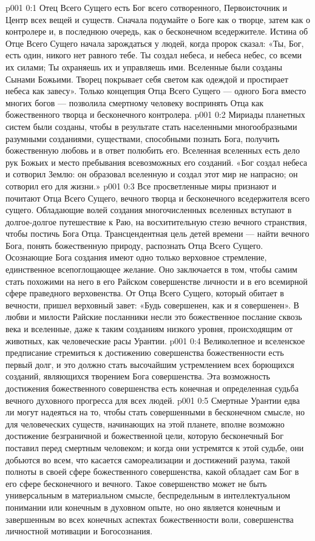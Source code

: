 \author{Божественный Советник}
\vs p001 0:1 Отец Всего Сущего есть Бог всего сотворенного, Первоисточник и Центр всех вещей и существ. Сначала подумайте о Боге как о творце, затем как о контролере и, в последнюю очередь, как о бесконечном вседержителе. Истина об Отце Всего Сущего начала зарождаться у людей, когда пророк сказал: «Ты, Бог, есть один, никого нет равного тебе. Ты создал небеса, и небеса небес, со всеми их силами; Ты охраняешь их и управляешь ими. Вселенные были созданы Сынами Божьими. Творец покрывает себя светом как одеждой и простирает небеса как завесу». Только концепция Отца Всего Сущего --- одного Бога вместо многих богов --- позволила смертному человеку воспринять Отца как божественного творца и бесконечного контролера.
\vs p001 0:2 Мириады планетных систем были созданы, чтобы в результате стать населенными многообразными разумными созданиями, существами, способными познать Бога, получить божественную любовь и в ответ полюбить его. Вселенная вселенных есть дело рук Божьих и место пребывания всевозможных его созданий. «Бог создал небеса и сотворил Землю: он образовал вселенную и создал этот мир не напрасно; он сотворил его для жизни.»
\vs p001 0:3 Все просветленные миры признают и почитают Отца Всего Сущего, вечного творца и бесконечного вседержителя всего сущего. Обладающие волей создания многочисленных вселенных вступают в долгое\hyp{}долгое путешествие к Раю, на восхитительную стезю вечного странствия, чтобы постичь Бога Отца. Трансцендентная цель детей времени --- найти вечного Бога, понять божественную природу, распознать Отца Всего Сущего. Осознающие Бога создания имеют одно только верховное стремление, единственное всепоглощающее желание. Оно заключается в том, чтобы самим стать похожими на него в его Райском совершенстве личности и в его всемирной сфере праведного верховенства. От Отца Всего Сущего, который обитает в вечности, пришел верховный завет: «Будь совершенен, как и я совершенен». В любви и милости Райские посланники несли это божественное послание сквозь века и вселенные, даже к таким созданиям низкого уровня, происходящим от животных, как человеческие расы Урантии.
\vs p001 0:4 Великолепное и вселенское предписание стремиться к достижению совершенства божественности есть первый долг, и это должно стать высочайшим устремлением всех борющихся созданий, являющихся творением Бога совершенства. Эта возможность достижения божественного совершенства есть конечная и определенная судьба вечного духовного прогресса для всех людей.
\vs p001 0:5 Смертные Урантии едва ли могут надеяться на то, чтобы стать совершенными в бесконечном смысле, но для человеческих существ, начинающих на этой планете, вполне возможно достижение безграничной и божественной цели, которую бесконечный Бог поставил перед смертным человеком; и когда они устремятся к этой судьбе, они добьются во всем, что касается самореализации и достижений разума, такой полноты в своей сфере божественного совершенства, какой обладает сам Бог в его сфере бесконечного и вечного. Такое совершенство может не быть универсальным в материальном смысле, беспредельным в интеллектуальном понимании или конечным в духовном опыте, но оно является конечным и завершенным во всех конечных аспектах божественности воли, совершенства личностной мотивации и Богосознания.
